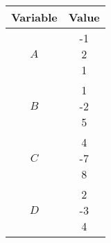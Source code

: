 \begin{tabular}{|c| c |}
\hline
\textbf{Variable} & \textbf{Value} \\
\hline
$A$ & \myvec{-1 \\ 2\\ 1\\}\\
\hline
$B$ & \myvec{1 \\ -2\\ 5\\}\\
\hline
$C$ & \myvec{4 \\ -7\\ 8\\}\\
\hline
$D$ & \myvec{2 \\ -3\\ 4\\}\\
\hline
\end{tabular} 